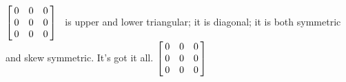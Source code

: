{$\left[\hskip -3pt \begin{array}{ccc} 0&0&0\\  0&0&0
\\  0&0&0\end{array}\hskip -3pt \right]$} 
{\tta\ is upper and lower triangular; it is diagonal; it is both symmetric and skew symmetric. It's got it all. $\left[\hskip -3pt \begin{array}{ccc} 0&0&0\\  0&0&0\\  0&0&0\end{array}\hskip -3pt \right]
$}



  

